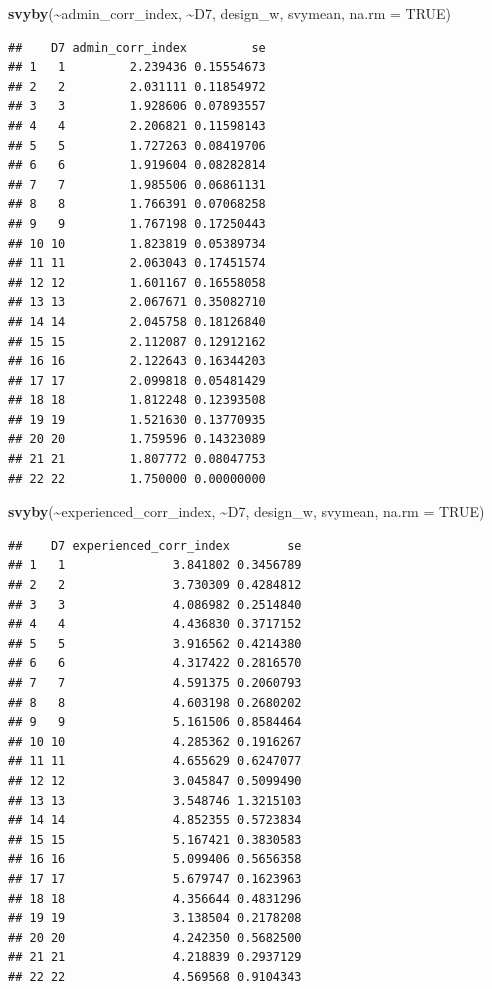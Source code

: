 \documentclass[
]{article}
\newenvironment{Shaded}{\begin{snugshade}}{\end{snugshade}}
\newcommand{\AttributeTok}[1]{\textcolor[rgb]{0.13,0.29,0.53}{#1}}
\newcommand{\ConstantTok}[1]{\textcolor[rgb]{0.56,0.35,0.01}{#1}}
\newcommand{\FunctionTok}[1]{\textcolor[rgb]{0.13,0.29,0.53}{\textbf{#1}}}
\newcommand{\NormalTok}[1]{#1}
\newcommand{\SpecialCharTok}[1]{\textcolor[rgb]{0.81,0.36,0.00}{\textbf{#1}}}
\begin{document}
\begin{Shaded}
\begin{Highlighting}[]
\FunctionTok{svyby}\NormalTok{(}\SpecialCharTok{\textasciitilde{}}\NormalTok{admin\_corr\_index, }\SpecialCharTok{\textasciitilde{}}\NormalTok{D7, design\_w, svymean, }\AttributeTok{na.rm =} \ConstantTok{TRUE}\NormalTok{)}
\end{Highlighting}
\end{Shaded}

\begin{verbatim}
##    D7 admin_corr_index         se
## 1   1         2.239436 0.15554673
## 2   2         2.031111 0.11854972
## 3   3         1.928606 0.07893557
## 4   4         2.206821 0.11598143
## 5   5         1.727263 0.08419706
## 6   6         1.919604 0.08282814
## 7   7         1.985506 0.06861131
## 8   8         1.766391 0.07068258
## 9   9         1.767198 0.17250443
## 10 10         1.823819 0.05389734
## 11 11         2.063043 0.17451574
## 12 12         1.601167 0.16558058
## 13 13         2.067671 0.35082710
## 14 14         2.045758 0.18126840
## 15 15         2.112087 0.12912162
## 16 16         2.122643 0.16344203
## 17 17         2.099818 0.05481429
## 18 18         1.812248 0.12393508
## 19 19         1.521630 0.13770935
## 20 20         1.759596 0.14323089
## 21 21         1.807772 0.08047753
## 22 22         1.750000 0.00000000
\end{verbatim}

\begin{Shaded}
\begin{Highlighting}[]
\FunctionTok{svyby}\NormalTok{(}\SpecialCharTok{\textasciitilde{}}\NormalTok{experienced\_corr\_index, }\SpecialCharTok{\textasciitilde{}}\NormalTok{D7, design\_w, svymean, }\AttributeTok{na.rm =} \ConstantTok{TRUE}\NormalTok{)}
\end{Highlighting}
\end{Shaded}

\begin{verbatim}
##    D7 experienced_corr_index        se
## 1   1               3.841802 0.3456789
## 2   2               3.730309 0.4284812
## 3   3               4.086982 0.2514840
## 4   4               4.436830 0.3717152
## 5   5               3.916562 0.4214380
## 6   6               4.317422 0.2816570
## 7   7               4.591375 0.2060793
## 8   8               4.603198 0.2680202
## 9   9               5.161506 0.8584464
## 10 10               4.285362 0.1916267
## 11 11               4.655629 0.6247077
## 12 12               3.045847 0.5099490
## 13 13               3.548746 1.3215103
## 14 14               4.852355 0.5723834
## 15 15               5.167421 0.3830583
## 16 16               5.099406 0.5656358
## 17 17               5.679747 0.1623963
## 18 18               4.356644 0.4831296
## 19 19               3.138504 0.2178208
## 20 20               4.242350 0.5682500
## 21 21               4.218839 0.2937129
## 22 22               4.569568 0.9104343
\end{verbatim}
\end{document}
